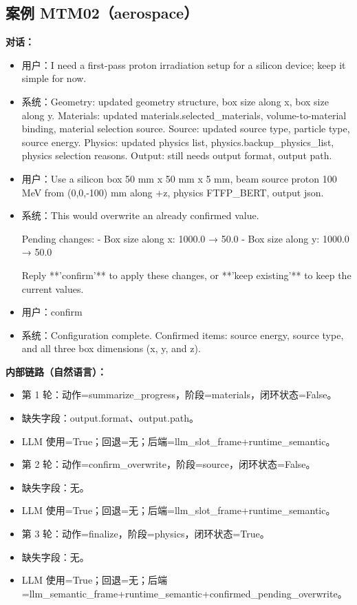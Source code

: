 \documentclass[11pt]{ctexart}
\begin{document}
\subsection{案例 MTM02（aerospace）}
\textbf{对话：}
\begin{itemize}
\item 用户：I need a first-pass proton irradiation setup for a silicon device; keep it simple for now.
\item 系统：Geometry: updated geometry structure, box size along x, box size along y. Materials: updated materials.selected\_materials, volume-to-material binding, material selection source. Source: updated source type, particle type, source energy. Physics: updated physics list, physics.backup\_physics\_list, physics selection reasons. Output: still needs output format, output path.
\item 用户：Use a silicon box 50 mm x 50 mm x 5 mm, beam source proton 100 MeV from (0,0,-100) mm along +z, physics FTFP\_BERT, output json.
\item 系统：This would overwrite an already confirmed value.

Pending changes:
- Box size along x: 1000.0 → 50.0
- Box size along y: 1000.0 → 50.0

Reply **'confirm'** to apply these changes, or **'keep existing'** to keep the current values.
\item 用户：confirm
\item 系统：Configuration complete. Confirmed items: source energy, source type, and all three box dimensions (x, y, and z).
\end{itemize}
\textbf{内部链路（自然语言）：}
\begin{itemize}
\item 第 1 轮：动作=summarize\_progress，阶段=materials，闭环状态=False。
\item 缺失字段：output.format、output.path。
\item LLM 使用=True；回退=无；后端=llm\_slot\_frame+runtime\_semantic。
\item 第 2 轮：动作=confirm\_overwrite，阶段=source，闭环状态=False。
\item 缺失字段：无。
\item LLM 使用=True；回退=无；后端=llm\_slot\_frame+runtime\_semantic。
\item 第 3 轮：动作=finalize，阶段=physics，闭环状态=True。
\item 缺失字段：无。
\item LLM 使用=True；回退=无；后端=llm\_semantic\_frame+runtime\_semantic+confirmed\_pending\_overwrite。
\end{itemize}
\end{document}
